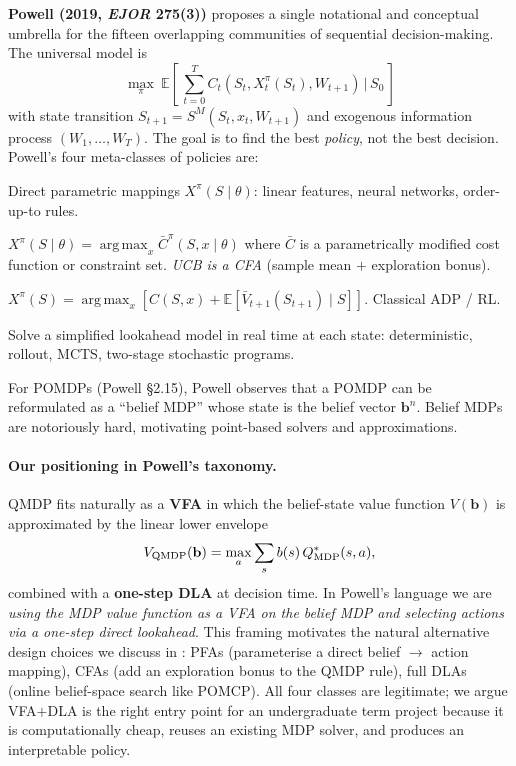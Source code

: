 \documentclass[11pt]{article}
\theoremstyle{plain1}
\theoremstyle{definition1}
\newcommand{\E}{\mathbb{E}}
\newcommand{\argmax}{\operatorname*{arg\,max}}
\newcommand{\1}{\mathbf{1}}
\newcommand{\bel}{\mathbf{b}}
\begin{document}
\textbf{Powell (2019, \emph{EJOR} 275(3))} proposes a single notational and conceptual umbrella for the fifteen overlapping communities of sequential decision-making. The universal model is
\[
\max_\pi\ \E\!\left[\, \sum_{t=0}^{T} C_t(S_t, X^\pi_t(S_t), W_{t+1}) \,\Big|\, S_0 \,\right]
\]
with state transition $S_{t+1} = S^M(S_t, x_t, W_{t+1})$ and exogenous information process $(W_1, \ldots, W_T)$. The goal is to find the best \emph{policy}, not the best decision. Powell's four meta-classes of policies are:
\begin{description}[itemsep=4pt,topsep=4pt]
  \item[Policy Function Approximations (PFAs).] Direct parametric mappings $X^\pi(S \mid \theta)$: linear features, neural networks, order-up-to rules.
  \item[Cost Function Approximations (CFAs).] $X^\pi(S \mid \theta) = \argmax_x \bar{C}^\pi(S, x \mid \theta)$ where $\bar{C}$ is a parametrically modified cost function or constraint set. \emph{UCB is a CFA} (sample mean $+$ exploration bonus).
  \item[Value Function Approximations (VFAs).] $X^\pi(S) = \argmax_x [C(S,x) + \E[\bar{V}_{t+1}(S_{t+1}) \mid S]]$. Classical ADP / RL.
  \item[Direct Lookahead Approximations (DLAs).] Solve a simplified lookahead model in real time at each state: deterministic, rollout, MCTS, two-stage stochastic programs.
\end{description}
For POMDPs (Powell \S 2.15), Powell observes that a POMDP can be reformulated as a ``belief MDP'' whose state is the belief vector $\bel^n$. Belief MDPs are notoriously hard, motivating point-based solvers and approximations.

\paragraph{Our positioning in Powell's taxonomy.}
QMDP fits naturally as a \textbf{VFA} in which the belief-state value function $V(\bel)$ is approximated by the linear lower envelope
\[
V_{\rm QMDP}(\bel) = \max_a \sum_s b(s)\, Q^\ast_{\rm MDP}(s, a),
\]
combined with a \textbf{one-step DLA} at decision time. In Powell's language we are \emph{using the MDP value function as a VFA on the belief MDP and selecting actions via a one-step direct lookahead}. This framing motivates the natural alternative design choices we discuss in : PFAs (parameterise a direct belief $\to$ action mapping), CFAs (add an exploration bonus to the QMDP rule), full DLAs (online belief-space search like POMCP). All four classes are legitimate; we argue VFA$+$DLA is the right entry point for an undergraduate term project because it is computationally cheap, reuses an existing MDP solver, and produces an interpretable policy.
\end{document}
